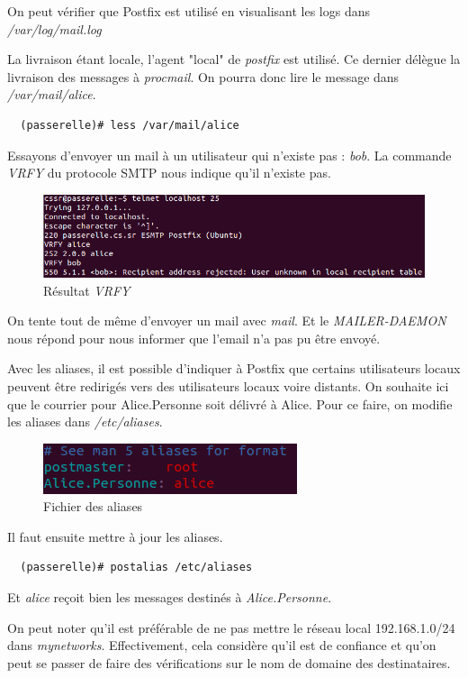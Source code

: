 \documentclass[a4paper]{article}
\begin{document}
On peut vérifier que Postfix est utilisé en visualisant les logs
dans \textit{/var/log/mail.log}

La livraison étant locale, l'agent "local" de \textit{postfix}
est utilisé. Ce dernier délègue la livraison des messages
à \textit{procmail}. On pourra donc lire le message dans 
\textit{/var/mail/alice}.
\begin{verbatim}
  (passerelle)# less /var/mail/alice
\end{verbatim}

Essayons d'envoyer un mail à un utilisateur qui n'existe pas : \textit{bob}.
La commande \textit{VRFY} du protocole SMTP nous indique qu'il n'existe pas.
\begin{figure}[!ht]
	\centering
	\includegraphics[scale=.6]{VRFY.PNG}
	\caption{\label{verify} Résultat \textit{VRFY}}
\end{figure}
 
On tente tout de même d'envoyer un mail avec \textit{mail}. Et 
le \textit{MAILER-DAEMON} nous répond pour nous informer que
l'email n'a pas pu être envoyé.

Avec les aliases, il est possible d'indiquer à Postfix que certains
utilisateurs locaux peuvent être redirigés vers des utilisateurs
locaux voire distants.
On souhaite ici que le courrier pour Alice.Personne soit délivré
à Alice. 
Pour ce faire, on modifie les aliases dans \textit{/etc/aliases}.
\begin{figure}[!ht]
	\centering
	\includegraphics[scale=.7]{Aliases.PNG}
	\caption{\label{alias} Fichier des aliases}
\end{figure}

Il faut ensuite mettre à jour les aliases.
\begin{verbatim}
  (passerelle)# postalias /etc/aliases
\end{verbatim}

Et \textit{alice} reçoit bien les messages destinés à
\textit{Alice.Personne}.

On peut noter qu'il est préférable de ne pas mettre le réseau local 192.168.1.0/24 dans
\textit{mynetworks}. Effectivement, cela considère qu'il est de confiance
et qu'on peut se passer de faire des vérifications sur le nom de domaine
des destinataires. 
\end{document}
